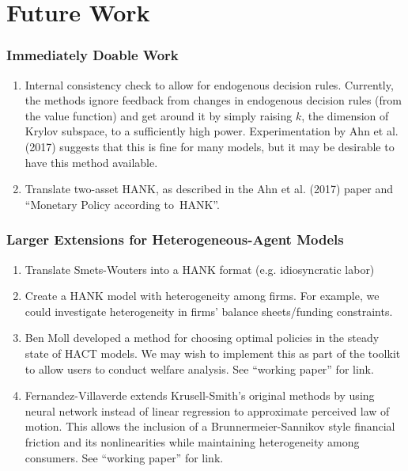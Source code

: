 \documentclass{beamer}
\begin{document}
\section{Future Work}

\begin{frame}
\frametitle{Immediately Doable Work}
\begin{enumerate}
\item Internal consistency check to allow for endogenous decision rules. Currently, the methods ignore feedback from changes in endogenous decision rules (from the value function) and get around it by simply raising $k$, the dimension of Krylov subspace, to a sufficiently high power. Experimentation by Ahn et al. (2017) suggests that this is fine for many models, but it may be desirable to have this method available.
\item Translate two-asset HANK, as described in the Ahn et al. (2017) paper and ``Monetary Policy according to\
 HANK''.
\end{enumerate}
\end{frame}

\begin{frame}
  \frametitle{Larger Extensions for Heterogeneous-Agent Models}
\begin{enumerate}
\item Translate Smets-Wouters into a HANK format (e.g. idiosyncratic labor)
\item Create a HANK model with heterogeneity among firms. For example, we could investigate heterogeneity in firms' balance sheets/funding constraints.
\item Ben Moll developed a method for choosing optimal policies in the steady state of HACT models. We may wish to implement this as part of the toolkit to allow users to conduct welfare analysis. See ``working paper'' for link.
\item Fernandez-Villaverde extends Krusell-Smith's original methods by using neural network instead of linear regression to approximate perceived law of motion. This allows the inclusion of a Brunnermeier-Sannikov style financial friction and its nonlinearities while maintaining heterogeneity among consumers. See ``working paper'' for link.
\end{enumerate}
\end{frame}
\end{document}
